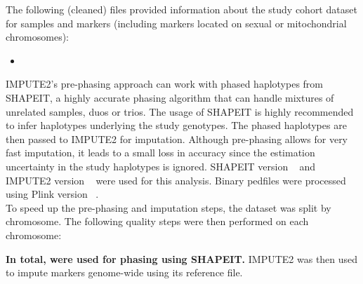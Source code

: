 
The following (cleaned) files provided information about the study cohort
dataset for  samples and 
markers (including  markers located on sexual or
mitochondrial chromosomes):

\begin{itemize}
  \item {}
\end{itemize}

IMPUTE2's pre-phasing approach can work with phased haplotypes from SHAPEIT, a
highly accurate phasing algorithm that can handle mixtures of unrelated
samples, duos or trios. The usage of SHAPEIT is highly recommended to infer
haplotypes underlying the study genotypes. The phased haplotypes are then
passed to IMPUTE2 for imputation. Although pre-phasing allows for very fast
imputation, it leads to a small loss in accuracy since the estimation
uncertainty in the study haplotypes is ignored. SHAPEIT version
~\cite{Delaneau13_23269371} and IMPUTE2 version
~\cite{Howie09_19543373,Howie11_22384356,Howie12_22820512}
were used for this analysis. Binary pedfiles were processed using Plink version
~\cite{Purcell07_17701901}.\\

To speed up the pre-phasing and imputation steps, the dataset was split by
chromosome. The following quality steps were then performed on each chromosome:


\textbf{In total,  were used for phasing using
SHAPEIT.} IMPUTE2 was then used to impute markers genome-wide using its
reference file.

